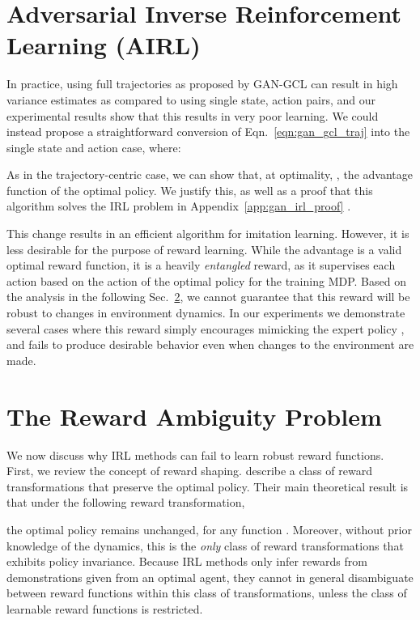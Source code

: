 \documentclass{article} \usepackage{iclr2018_conference,times}
\begin{document}
\section{Adversarial Inverse Reinforcement Learning (AIRL)}
\label{sec:gan_irl}
In practice, using full trajectories as proposed by GAN-GCL can result in high variance estimates as compared to using single state, action pairs, and our experimental results show that this results in very poor learning. We could instead propose a straightforward conversion of Eqn.~\ref{eqn:gan_gcl_traj} into the single state and action case, where:

As in the trajectory-centric case, we can show that, at optimality, , the advantage function of the optimal policy. We justify this, as well as a proof that this algorithm solves the IRL problem in Appendix~\ref{app:gan_irl_proof} .

This change results in an efficient algorithm for imitation learning. However, it is less desirable for the purpose of reward learning. While the advantage is a valid optimal reward function, it is a heavily \textit{entangled} reward, as it supervises each action based on the action of the optimal policy for the training MDP. Based on the analysis in the following Sec.~\ref{sec:disentangle}, we cannot guarantee that this reward will be robust to changes in environment dynamics. In our experiments we demonstrate several cases where this reward simply encourages mimicking the expert policy , and fails to produce desirable behavior even when changes to the environment are made.
 
\section{The Reward Ambiguity Problem}
\label{sec:disentangle}

We now discuss why IRL methods can fail to learn robust reward functions. First, we review the concept of reward shaping. \citet{Ng1999} describe a class of reward transformations that preserve the optimal policy. Their main theoretical result is that under the following reward transformation,

the optimal policy remains unchanged, for any function . Moreover, without prior knowledge of the dynamics, this is the \textit{only} class of reward transformations that exhibits policy invariance. Because IRL methods only infer rewards from demonstrations given from an optimal agent, they cannot in general disambiguate between reward functions within this class of transformations, unless the class of learnable reward functions is restricted.
\end{document}
